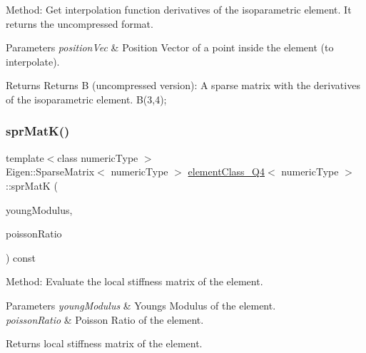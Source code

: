 Method\+: Get interpolation function derivatives of the isoparametric element. It returns the uncompressed format. 
\begin{DoxyParams}{Parameters}
{\em position\+Vec} & Position Vector of a point inside the element (to interpolate). \\
\hline
\end{DoxyParams}
\begin{DoxyReturn}{Returns}
Returns B (uncompressed version)\+: A sparse matrix with the derivatives of the isoparametric element. B(3,4); 
\end{DoxyReturn}
\mbox{\label{classelement_class___q4_afcfb65b64fe9909300405219739ed496}} 
\subsubsection{\texorpdfstring{spr\+Mat\+K()}{sprMatK()}}
{\footnotesize\ttfamily template$<$class numeric\+Type $>$ \\
Eigen\+::\+Sparse\+Matrix$<$ numeric\+Type $>$ \mbox{\hyperlink{classelement_class___q4}{element\+Class\+\_\+\+Q4}}$<$ numeric\+Type $>$\+::spr\+MatK (\begin{DoxyParamCaption}\item[{numeric\+Type}]{young\+Modulus,  }\item[{numeric\+Type}]{poisson\+Ratio }\end{DoxyParamCaption}) const}

Method\+: Evaluate the local stiffness matrix of the element. 
\begin{DoxyParams}{Parameters}
{\em young\+Modulus} & Young\textquotesingle{}s Modulus of the element. \\
\hline
{\em poisson\+Ratio} & Poisson Ratio of the element. \\
\hline
\end{DoxyParams}
\begin{DoxyReturn}{Returns}
local stiffness matrix of the element. 
\end{DoxyReturn}
\mbox{\label{classelement_class___q4_adc47e0786349f327fe45e3744080d3c5}} 
